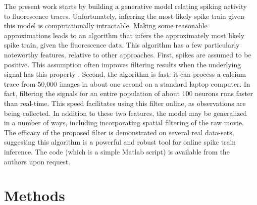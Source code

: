The present work starts by building a generative model relating spiking activity to fluorescence traces. Unfortunately, inferring the most likely spike train given this model is computationally intractable.  Making some reasonable approximations leads to an algorithm that infers the approximately most likely spike train, given the fluorescence data.  This algorithm has a few particularly noteworthy features, relative to other approaches.  First, spikes are assumed to be positive.  This assumption often improves filtering results when the underlying signal has this property \cite{PortugalVicente94, MarkhamConchello99, LeeSeung99, LLS04, OGradyPearlmutter06, HuysPaninski06, Cunningham08, PaninskiWu09}.  Second, the algorithm is fast: it can process a calcium trace from 50,000 images in about one second on a standard laptop computer. In fact, filtering the signals for an entire population of about $100$ neurons runs faster than real-time. This speed facilitates using this filter online, as observations are being collected. In addition to these two features, the model may be generalized in a number of ways, including incorporating spatial filtering of the raw movie. The efficacy of the proposed filter is demonstrated on several real data-sets, suggesting this algorithm is a powerful and robust tool for online spike train inference.  The code (which is a simple Matlab script) is available from the authors upon request.







\section{Methods} \label{sec:methods}



